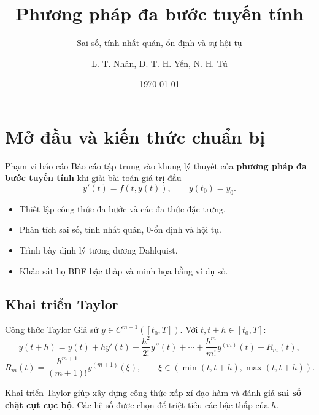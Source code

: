 \documentclass[aspectratio=43]{beamer}
\title[Phương pháp đa bước tuyến tính]{Phương pháp đa bước tuyến tính}
\subtitle{Sai số, tính nhất quán, ổn định và sự hội tụ}
\author{L. T. Nhân, D. T. H. Yến, N. H. Tú}
\institute{Trường Đại học Khoa học Tự nhiên, ĐHQG-HCM}
\date{\today}
\begin{document}
\begin{frame}
  \titlepage
\end{frame}

\begin{frame}
\tableofcontents
\end{frame}

\section{Mở đầu và kiến thức chuẩn bị}

\begin{frame}
\begin{baitapbox}{Phạm vi báo cáo}
Báo cáo tập trung vào khung lý thuyết của \textbf{phương pháp đa bước tuyến tính} khi giải bài toán giá trị đầu
\[
  y'(t)=f(t,y(t)),\qquad y(t_0)=y_0.
\]
\end{baitapbox}
\begin{itemize}
  \item Thiết lập công thức đa bước và các đa thức đặc trưng.
  \item Phân tích sai số, tính nhất quán, 0-ổn định và hội tụ.
  \item Trình bày định lý tương đương Dahlquist.
  \item Khảo sát họ BDF bậc thấp và minh họa bằng ví dụ số.
\end{itemize}
\end{frame}
\subsection*{Khai triển Taylor}
\begin{frame}
\begin{baitapbox}{Công thức Taylor}
Giả sử $y\in C^{m+1}([t_0,T])$. Với $t,t+h\in [t_0,T]$:
\[
 y(t+h)=y(t)+hy'(t)+\frac{h^2}{2!}y''(t)+\cdots+\frac{h^m}{m!}y^{(m)}(t)+R_m(t),
\]
\[
 R_m(t)=\frac{h^{m+1}}{(m+1)!}y^{(m+1)}(\xi),\qquad \xi \in (\min(t,t+h),\max(t,t+h)).
\]
\end{baitapbox}
\begin{tcolorbox}[title={Vai trò trong phương pháp đa bước}, colback=softgreen, colframe=tealgreen, colbacktitle=tealgreen]
Khai triển Taylor giúp xây dựng công thức xấp xỉ đạo hàm và đánh giá \textbf{sai số chặt cụt cục bộ}. Các hệ số được chọn để triệt tiêu các bậc thấp của $h$.
\end{tcolorbox}
\end{frame}
\end{document}
